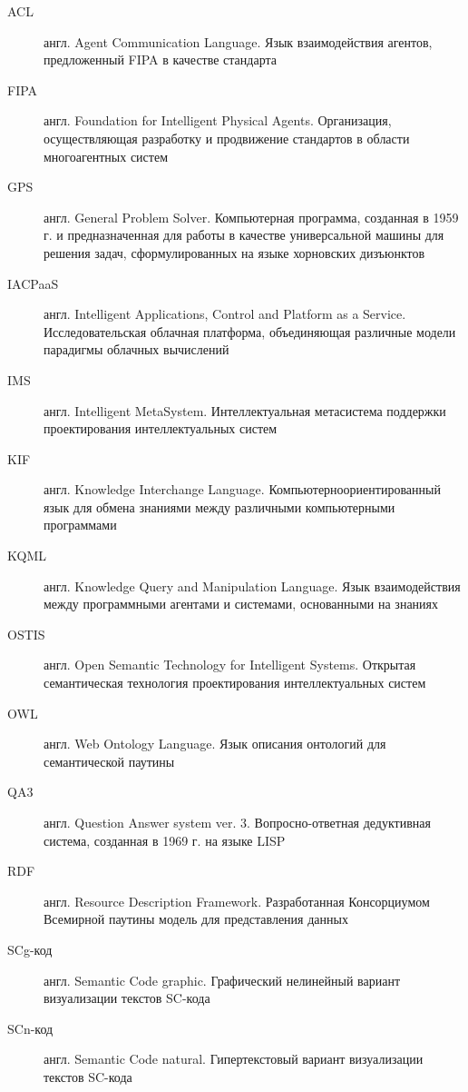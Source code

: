 %
%


\begin{description}
\item[ACL] англ. Agent Communication Language. Язык взаимодействия агентов, предложенный FIPA в качестве стандарта
\item[FIPA] англ. Foundation for Intelligent Physical Agents. Организация, осуществляющая разработку и продвижение стандартов в области многоагентных систем
\item[GPS] англ. General Problem Solver. Компьютерная программа, созданная в 1959 г. и предназначенная для работы в качестве универсальной машины для решения задач, сформулированных на языке хорновских дизъюнктов
\item[IACPaaS] англ. Intelligent Applications, Control and Platform as a Service. Исследовательская облачная платформа, объединяющая различные модели парадигмы облачных вычислений
\item[IMS] англ. Intelligent MetaSystem. Интеллектуальная метасистема поддержки проектирования интеллектуальных систем
\item[KIF] англ. Knowledge Interchange Language. Компьютерноориентированный язык для обмена знаниями между различными компьютерными программами
\item[KQML] англ. Knowledge Query and Manipulation Language. Язык взаимодействия между программными агентами и системами, основанными на знаниях
\item[OSTIS] англ. Open Semantic Technology for Intelligent Systems. Открытая семантическая технология проектирования интеллектуальных систем
\item[OWL] англ. Web Ontology Language. Язык описания онтологий для семантической паутины
\item[QA3] англ. Question Answer system ver. 3. Вопросно-ответная дедуктивная система, созданная в 1969 г. на языке LISP
\item[RDF] англ. Resource Description Framework. Разработанная Консорциумом Всемирной паутины модель для представления данных
\item[SCg-код] англ. Semantic Code graphic. Графический нелинейный вариант визуализации текстов SC-кода
\item[SCn-код] англ. Semantic Code natural. Гипертекстовый вариант визуализации текстов SC-кода

\end{description}
